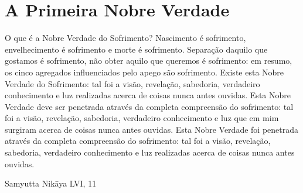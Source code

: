 \chapter{A Primeira Nobre Verdade}

O que é a Nobre Verdade do Sofrimento?
Nascimento é sofrimento, envelhecimento é sofrimento e morte é sofrimento. Separação daquilo que
gostamos é sofrimento, não obter aquilo que queremos é sofrimento: em resumo, os cinco agregados
influenciados pelo apego são sofrimento.
Existe esta Nobre Verdade do Sofrimento: tal
foi a visão, revelação, sabedoria, verdadeiro conhecimento e luz realizadas acerca de coisas nunca antes
ouvidas.
Esta Nobre Verdade deve ser penetrada através
da completa compreensão do sofrimento: tal foi a
visão, revelação, sabedoria, verdadeiro conhecimento e luz que em mim surgiram acerca de coisas
nunca antes ouvidas.
Esta Nobre Verdade foi penetrada através da
completa compreensão do sofrimento: tal foi a
visão, revelação, sabedoria, verdadeiro conhecimento e luz realizadas acerca de coisas nunca antes
ouvidas.

Samyutta Nikāya LVI, 11

